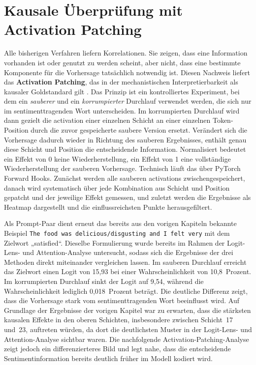 \section{Kausale Überprüfung mit Activation Patching}

Alle bisherigen Verfahren liefern Korrelationen. Sie zeigen, dass eine Information vorhanden ist oder genutzt zu werden scheint, aber nicht, dass eine bestimmte Komponente für die Vorhersage tatsächlich notwendig ist. Diesen Nachweis liefert das \textbf{Activation Patching}, das in der mechanistischen Interpretierbarkeit als kausaler Goldstandard gilt \cite{meng2022locating, goldowskydill2023localizing}. Das Prinzip ist ein kontrolliertes Experiment, bei dem ein \emph{sauberer} und ein \emph{korrumpierter} Durchlauf verwendet werden, die sich nur im sentimenttragenden Wort unterscheiden. Im korrumpierten Durchlauf wird dann gezielt die \gls{activation} einer einzelnen Schicht an einer einzelnen Token-Position durch die zuvor gespeicherte saubere Version ersetzt. Verändert sich die Vorhersage dadurch wieder in Richtung des sauberen Ergebnisses, enthält genau diese Schicht und Position die entscheidende Information. Normalisiert bedeutet ein Effekt von 0 keine Wiederherstellung, ein Effekt von 1 eine vollständige Wiederherstellung der sauberen Vorhersage. Technisch läuft das über PyTorch Forward Hooks. Zunächst werden alle sauberen \glspl{activation} zwischengespeichert, danach wird systematisch über jede Kombination aus Schicht und Position gepatcht und der jeweilige Effekt gemessen, und zuletzt werden die Ergebnisse als Heatmap dargestellt und die einflussreichsten Punkte herausgefiltert.

Als Prompt-Paar dient erneut das bereits aus den vorigen Kapiteln bekannte Beispiel \texttt{The food was delicious/disgusting and I felt very} mit dem Zielwort „satisfied“. Dieselbe Formulierung wurde bereits im Rahmen der Logit-Lens- und Attention-Analyse untersucht, sodass sich die Ergebnisse der drei Methoden direkt miteinander vergleichen lassen. Im sauberen Durchlauf erreicht das Zielwort einen Logit von 15,93 bei einer Wahrscheinlichkeit von 10,8~Prozent. Im korrumpierten Durchlauf sinkt der Logit auf 9,54, während die Wahrscheinlichkeit lediglich 0,018~Prozent beträgt. Die deutliche Differenz zeigt, dass die Vorhersage stark vom sentimenttragenden Wort beeinflusst wird. Auf Grundlage der Ergebnisse der vorigen Kapitel war zu erwarten, dass die stärksten kausalen Effekte in den oberen Schichten, insbesondere zwischen Schicht~17 und~23, auftreten würden, da dort die deutlichsten Muster in der Logit-Lens- und Attention-Analyse sichtbar waren. Die nachfolgende Activation-Patching-Analyse zeigt jedoch ein differenzierteres Bild und legt nahe, dass die entscheidende Sentimentinformation bereits deutlich früher im Modell kodiert wird.

